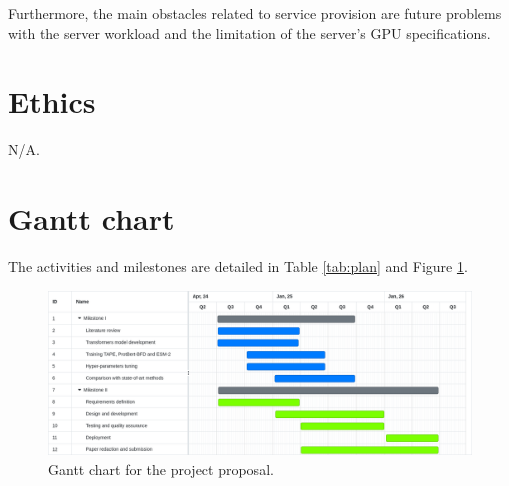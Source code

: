 \documentclass[a4paper,11pt]{article}
\begin{document}
Furthermore, the main obstacles related to service provision are future problems with the server workload and the limitation of the server's GPU specifications. 


\section{Ethics}
N/A.

\section{Gantt chart}

The activities and milestones are detailed in Table \ref{tab:plan} and Figure \ref{fig:gantt}.

\begin{figure}[h]
	\centering	
	\includegraphics[width=\textwidth]{img/neoantigen/gantt}
	\caption{Gantt chart for the project proposal.}
	\label{fig:gantt}
	
\end{figure}
	
	


	
	
	
	
\end{document}
